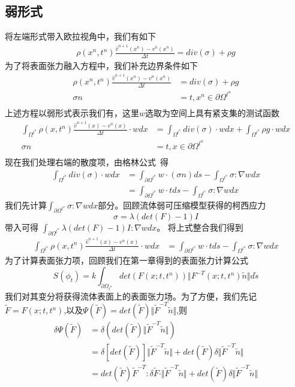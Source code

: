 \subsection{弱形式}
将左端形式带入欧拉视角中，我们有如下
\begin{align*}
    \rho(x^n,t^n)\frac{\hat{v}^{n+1}(x^n) - v^n(x^n)}{\Delta t} = div(\sigma) + \rho g
\end{align*}
为了将表面张力融入方程中，我们补充边界条件如下
\begin{align*}
    \rho(x^n,t^n)\frac{\hat{v}^{n+1}(x^n) - v^n(x^n)}{\Delta t} &= div(\sigma) + \rho g \\
    \sigma n &= t, x^n \in \partial \Omega^{t^n}\\
\end{align*}
上述方程以弱形式表示我们有，这里$w$选取为空间上具有紧支集的测试函数
\begin{align*}
    \int_{\Omega^{t^n}}\rho(x,t^n)\frac{\hat{v}^{n+1}(x) - v^n(x)}{\Delta t}\cdot wdx &= \int_{\Omega^{t^n}} div(\sigma)\cdot w dx + \int_{\Omega^{t^n}}\rho g\cdot w dx\\
    \sigma n &= t, x \in \partial \Omega^{t^n}\\   
\end{align*}
现在我们处理右端的散度项，由格林公式~\cite{evans1998partial}得
\begin{align*}
    \int_{\Omega^{t^n}} div(\sigma)\cdot w dx &= \int_{\partial \Omega^{t^n}}w\cdot (\sigma n) ds - \int_{\Omega^{t^n}} \sigma : \nabla w dx\\
        &= \int_{\partial \Omega^{t^n}}w\cdot t ds - \int_{\Omega^{t^n}} \sigma :\nabla w dx
\end{align*}
我们先计算$\int_{\partial \Omega^{t^n}}\sigma : \nabla w dx$部分。回顾流体弱可压缩模型获得的柯西应力$$\sigma = \lambda (det(F) - 1)I$$带入可得
$\int_{\partial \Omega^{t^n}} \lambda (det(F) - 1) I:\nabla w dx$。
将上式整合我们得到
\begin{align*}
    \int_{\Omega^{t^n}}\rho(x,t^n)\frac{\hat{v}^{n+1}(x) - v^n(x)}{\Delta t}\cdot wdx &= \int_{\partial \Omega^{t^n}} w\cdot t ds - \int_{\Omega^{t^n}} \sigma:\nabla w dx
\end{align*}
为了计算表面张力项，回顾我们在第一章得到的表面张力计算公式
$$S(\phi_{t}) = k \int_{\partial \Omega_{t^n}} det(F(x;t,t^{n})) \Vert F^{-T}(x;t,t^{n})\tilde{n}\Vert d\tilde{s}$$
我们对其变分将获得流体表面上的表面张力场。为了方便，我们先记$\tilde{F} = F(x;t,t^n)$,以及$\Psi(\tilde{F}) = det(\tilde{F})\Vert \tilde{F}^{-T}\tilde{n} \Vert$,则
\begin{align}
    \delta \Psi(\tilde{F}) &= \delta(det(\tilde{F})\Vert \tilde{F}^{-T}\tilde{n} \Vert) \nonumber\\
    &= \delta[det(\tilde{F})] \Vert \tilde{F}^{-T} \tilde{n} \Vert + det(\tilde{F})\delta \Vert \tilde{F}^{-T}\tilde{n} \Vert \nonumber\\
    &= det(\tilde{F})\tilde{F}^{-T}:\delta \tilde{F} \cdot \Vert \tilde{F}^{-T}\tilde{n}\Vert + det(\tilde{F})\delta \Vert \tilde{F}^{-T} \tilde{n} \Vert
\end{align}
